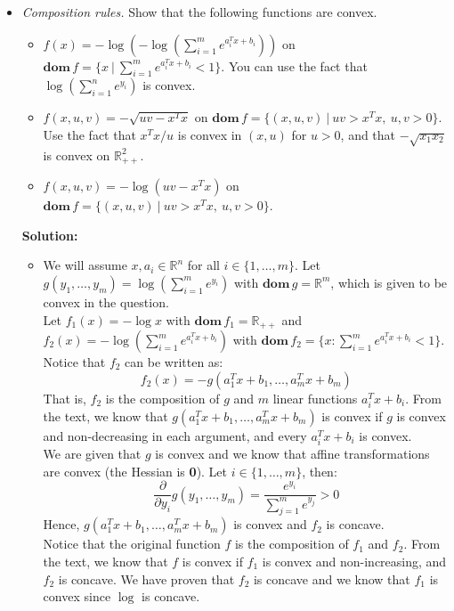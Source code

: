 \documentclass{article}
\begin{document}
\begin{itemize}
  \item[3.22] \textit{Composition rules.} Show that the following functions are convex.
  \begin{itemize}
    \item[(a)] $f(x) = -\log\left(-\log\left(\sum_{i=1}^m e^{a_i^Tx+b_i}\right)\right)$ on $\mathbf{dom}\,f = \{x ~ | ~ \sum_{i=1}^m e^{a_i^Tx+b_i} < 1\}$. You can use the fact that $\log\left(\sum_{i=1}^n e^{y_i}\right)$ is convex.
    \item[(b)]  $f(x, u, v) = -\sqrt{uv - x^Tx}$ on $\mathbf{dom}\,f = \{(x, u, v) ~ | ~ uv > x^Tx, ~ u, v > 0\}$. Use the fact that $x^Tx / u$ is convex in $(x, u)$ for $u > 0$, and that $-\sqrt{x_1x_2}$ is convex on $\mathbb{R}_{++}^2$.
    \item[(c)] $f(x, u, v) = -\log(uv - x^Tx)$ on $\mathbf{dom}\,f = \{(x, u, v) ~ | ~ uv > x^Tx, ~ u, v > 0\}$.
  \end{itemize}
  \textbf{Solution:}
  \begin{itemize}
    \item[(a)] We will assume $x, a_i \in \mathbb{R}^n$ for all $i \in \{1, \dots, m\}$. Let $g(y_1, \dots, y_m) = \log\left(\sum_{i=1}^m e^{y_i}\right)$ with $\mathbf{dom}\,g = \mathbb{R}^m$, which is given to be convex in the question. \\
    Let $f_1(x) = -\log x$ with $\mathbf{dom}\,f_1 = \mathbb{R}_{++}$ and $f_2(x) = -\log\left(\sum_{i=1}^m e^{a_i^Tx+b_i}\right)$ with $\mathbf{dom}\,f_2 = \{x : \sum_{i=1}^m e^{a_i^Tx+b_i} < 1\}$. Notice that $f_2$ can be written as:
    \[ f_2(x) = -g(a_1^Tx+b_1, \dots, a_m^Tx+b_m) \]
    That is, $f_2$ is the composition of $g$ and $m$ linear functions $a_i^Tx+b_i$. From the text, we know that $g(a_1^Tx+b_1, \dots, a_m^Tx+b_m)$ is convex if $g$ is convex and non-decreasing in each argument, and every $a_i^Tx+b_i$ is convex. \\
    We are given that $g$ is convex and we know that affine transformations are convex (the Hessian is \textbf{0}). Let $i \in \{1, \dots, m\}$, then:
    \[ \frac{\partial}{\partial y_i}g(y_1, \dots, y_m) = \frac{e^{y_i}}{\sum_{j=1}^m e^{y_j}} > 0 \]
    Hence, $g(a_1^Tx+b_1, \dots, a_m^Tx+b_m)$ is convex and $f_2$ is concave. \\
    Notice that the original function $f$ is the composition of $f_1$ and $f_2$. From the text, we know that $f$ is convex if $f_1$ is convex and non-increasing, and $f_2$ is concave. We have proven that $f_2$ is concave and we know that $f_1$ is convex since $\log$ is concave.
    \begin{align*}

\end{align*}
\end{itemize}
\end{itemize}
\end{document}
